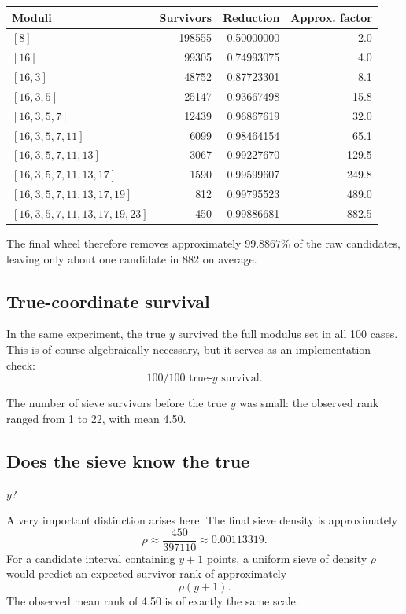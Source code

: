 \documentclass[11pt,a4paper]{article}
\begin{document}
\begin{center}
\begin{tabular}{lrrr}
\toprule
Moduli & Survivors & Reduction & Approx. factor \\
\midrule
\([8]\) & 198555 & 0.50000000 & 2.0\\
\([16]\) & 99305 & 0.74993075 & 4.0\\
\([16,3]\) & 48752 & 0.87723301 & 8.1\\
\([16,3,5]\) & 25147 & 0.93667498 & 15.8\\
\([16,3,5,7]\) & 12439 & 0.96867619 & 32.0\\
\([16,3,5,7,11]\) & 6099 & 0.98464154 & 65.1\\
\([16,3,5,7,11,13]\) & 3067 & 0.99227670 & 129.5\\
\([16,3,5,7,11,13,17]\) & 1590 & 0.99599607 & 249.8\\
\([16,3,5,7,11,13,17,19]\) & 812 & 0.99795523 & 489.0\\
\([16,3,5,7,11,13,17,19,23]\) & 450 & 0.99886681 & 882.5\\
\bottomrule
\end{tabular}
\end{center}

The final wheel therefore removes approximately \(99.8867\%\) of the raw candidates, leaving only about one candidate in 882 on average.

\subsection{True-coordinate survival}

In the same experiment, the true \(y\) survived the full modulus set in all 100 cases. This is of course algebraically necessary, but it serves as an implementation check:
\begin{equation}
\boxed{100/100\text{ true-}y\text{ survival}.}
\end{equation}

The number of sieve survivors before the true \(y\) was small: the observed rank ranged from 1 to 22, with mean 4.50.

\subsection{Does the sieve know the true }\(y\)?

A very important distinction arises here. The final sieve density is approximately
\begin{equation}
\rho\approx\frac{450}{397110}\approx0.00113319.
\end{equation}
For a candidate interval containing \(y+1\) points, a uniform sieve of density \(\rho\) would predict an expected survivor rank of approximately
\begin{equation}
\rho(y+1).
\end{equation}
The observed mean rank of 4.50 is of exactly the same scale.
\end{document}
